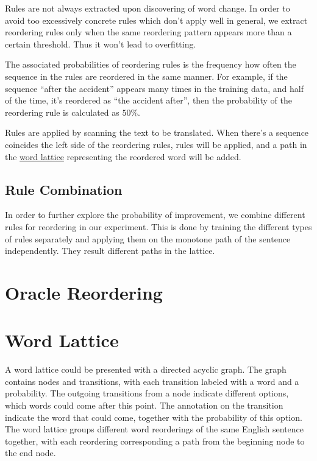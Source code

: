 Rules are not always extracted upon discovering of word change. In order to avoid too excessively concrete rules which don't apply well in general, we extract reordering rules only when the same reordering pattern appears more than a certain threshold. Thus it won't lead to overfitting.

The associated probabilities of reordering rules is the frequency how often the sequence in the rules are reordered in the same manner. For example, if the sequence ``after the accident'' appears many times in the training data, and half of the time, it's reordered as ``the accident after'', then the probability of the reordering rule is calculated as $50\%$.

Rules are applied by scanning the text to be translated. When there's a sequence coincides the left side of the reordering rules, rules will be applied, and a path in the \hyperref[ch:Foundations:sec:Lattices]{word lattice} representing the reordered word will be added.

\subsection{Rule Combination}

In order to further explore the probability of improvement, we combine different rules for reordering in our experiment. This is done by training the different types of rules separately and applying them on the monotone path of the sentence independently. They result different paths in the lattice.



\section{Oracle Reordering}
\label{ch:Foundations:sec:oracle}



\section{Word Lattice}
\label{ch:Foundations:sec:Lattices}
A word lattice could be presented with a directed acyclic graph. The graph contains nodes and transitions, with each transition labeled with a word and a probability. The outgoing transitions from a node indicate different options, which words could come after this point. The annotation on the transition indicate the word that could come, together with the probability of this option. The word lattice groups different word reorderings of the same English sentence together, with each reordering corresponding a path from the beginning node to the end node. 

